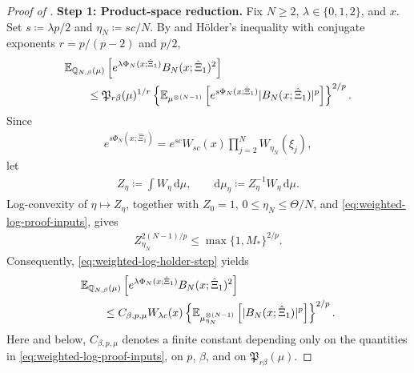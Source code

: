\documentclass[11pt,reqno]{amsart}
\numberwithin{equation}{section}
\theoremstyle{plain}
\theoremstyle{remark}
\newcommand{\md}{\mathrm{d}}
\newcommand{\E}{{\mathbb{E}}}
\newcommand{\Q}{{\mathbb{Q}}}
\newcommand{\be}{\beta}
\newcommand{\step}[1]{\par\medskip\noindent\textbf{#1}}
\begin{document}
\begin{proof}[Proof of ]
\step{Step 1: Product-space reduction.}
Fix \(N\ge2\), \(\lambda\in\{0,1,2\}\), and \(x\).  Set \(s\coloneqq \lambda p/2\) and \(\eta_N\coloneqq sc/N\).  By  and H\"older's inequality with conjugate exponents \(r=p/(p-2)\) and \(p/2\),
\begin{align}\label{eq:weighted-log-holder-step}
&\E_{\Q_{N,\be}(\mu)}\left[
 e^{\lambda\Phi_N(x;\hat\Xi_1)}B_N(x;\hat\Xi_1)^2\right] \notag\\
&\qquad\le
 \mathfrak P_{r\be}(\mu)^{1/r}
 \left\{\E_{\mu^{\otimes(N-1)}}\left[
 e^{s\Phi_N(x;\hat\Xi_1)}|B_N(x;\hat\Xi_1)|^p\right]\right\}^{2/p}.
\end{align}
Since
\begin{align}\label{eq:weighted-log-product-factorization}
 e^{s\Phi_N(x;\hat\Xi_1)}
 =e^{sc}W_{sc}(x)\prod_{j=2}^N W_{\eta_N}(\xi_j),
\end{align}
let
\begin{align}\label{eq:weighted-log-tilted-law}
 Z_\eta\coloneqq \int W_\eta\,\md\mu,
 \qquad
 \md\mu_\eta\coloneqq Z_\eta^{-1}W_\eta\,\md\mu.
\end{align}
Log-convexity of \(\eta\mapsto Z_\eta\), together with \(Z_0=1\), \(0\le\eta_N\le \Theta/N\), and \eqref{eq:weighted-log-proof-inputs}, gives
\begin{align}\label{eq:weighted-log-product-weight-bound}
 Z_{\eta_N}^{2(N-1)/p}
 \le \max\{1,M_*\}^{2/p}.
\end{align}
Consequently, \eqref{eq:weighted-log-holder-step} yields
\begin{align}\label{eq:weighted-log-holder-reduced}
&\E_{\Q_{N,\be}(\mu)}\left[
 e^{\lambda\Phi_N(x;\hat\Xi_1)}B_N(x;\hat\Xi_1)^2\right] \notag\\
&\qquad\le
 C_{\be,p,\mu} W_{\lambda c}(x)
 \left\{\E_{\mu_{\eta_N}^{\otimes(N-1)}}\left[
 |B_N(x;\hat\Xi_1)|^p\right]\right\}^{2/p}.
\end{align}
Here and below, \(C_{\be,p,\mu}\) denotes a finite constant depending only on the quantities in \eqref{eq:weighted-log-proof-inputs}, on \(p\), \(\be\), and on \(\mathfrak P_{r\be}(\mu)\).


\end{proof}
\end{document}
